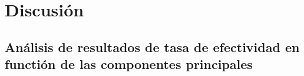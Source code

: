 \section{Discusión}

\subsection{Análisis de resultados de tasa de efectividad en functión de las componentes principales}

%
%
%
%

